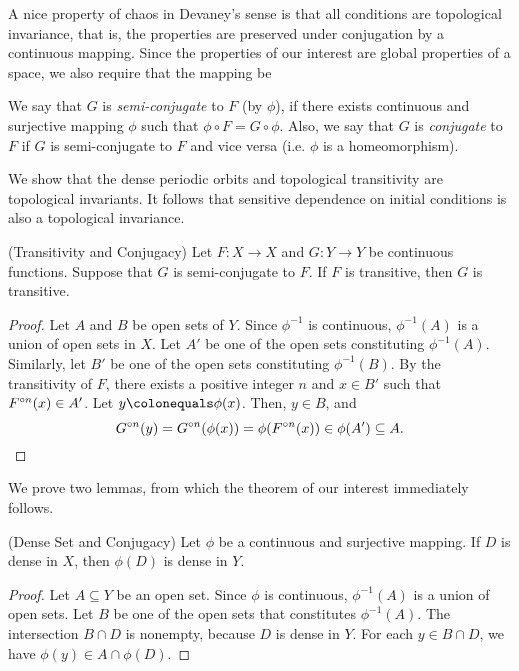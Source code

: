 \documentclass[12pt,draft,twoside]{book}
\begin{document}
A nice property of chaos in Devaney's sense is that all conditions are topological invariance, that is, the properties are preserved under conjugation by a continuous mapping.
Since the properties of our interest are global properties of a space, we also require that the mapping be 
\begin{definition}
    We say that $G$ is \textit{semi-conjugate} to $F$ (by $\phi$), if there exists continuous and surjective mapping $\phi$ such that $\phi\circ F = G\circ\phi$.
    Also, we say that $G$ is \textit{conjugate} to $F$ if $G$ is semi-conjugate to $F$ and vice versa (i.e. $\phi$ is a homeomorphism).
\end{definition}
We show that the dense periodic orbits and topological transitivity are topological invariants.
It follows that sensitive dependence on initial conditions is also a topological invariance.
  \begin{theorem}
    (Transitivity and Conjugacy) 
    Let $F: X \to X$ and $G: Y \to Y$ be continuous functions.
    Suppose that $G$ is semi-conjugate to $F$.
    If $F$ is transitive, then $G$ is transitive.
    \label{thm:conj-trans}
    \begin{proof}
      Let $A$ and $B$ be open sets of $Y$.
      Since $\phi^{-1}$ is continuous, $\phi^{-1}(A)$ is a union of open sets in $X$.
      Let $A'$ be one of the open sets constituting $\phi^{-1}(A)$.
      Similarly, let $B'$ be one of the open sets constituting $\phi^{-1}(B)$.
      By the transitivity of $F$, there exists a positive integer $n$ and $x \in B'$ such that $F^{\circ n}(x)\in A'$.
      Let $y \ceq \phi(x)$.
      Then, $y \in B$, and 
      \begin{equation*}
        G^{\circ n}(y) 
        = G^{\circ n}(\phi(x))
        = \phi(F^{\circ n}(x)) \in \phi(A') \subseteq A.
      \end{equation*}
      \end{proof}
  \end{theorem}
  We prove two lemmas, from which the theorem of our interest immediately follows.
  \begin{lemma}
    (Dense Set and Conjugacy) 
    Let $\phi$ be a continuous and surjective mapping.
    If $D$ is dense in $X$, then $\phi(D)$ is dense in $Y$.
    \label{thm:conj-dense}
    \begin{proof}
      Let $A \subseteq Y$ be an open set.
      Since $\phi$ is continuous, $\phi^{-1} (A)$ is a union of open sets.
      Let $B$ be one of the open sets that constitutes $\phi^{-1}(A)$.
      The intersection $B \cap D$ is nonempty, because $D$ is dense in $Y$.
      For each $y \in B \cap D$, we have $\phi(y) \in A \cap \phi(D)$.
    \end{proof}
  \end{lemma}
\end{document}
